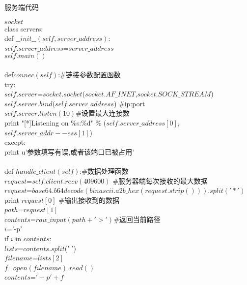 \begin{breakablealgorithm}
	\caption{服务端代码}
	\begin{algorithmic}[1]
	\Require $socket$\\
class servers:\\

\qquad def $\_\_init\_\_(self,server\_address)$:\\
		\qquad \qquad $self.server\_address$=$server\_address$\\
		\qquad \qquad $self.main()$\\
\\
\qquad def\quad  $connec(self)$:\qquad\#链接参数配置函数\\
		\qquad \qquad try:\\
			\qquad \qquad \qquad $self.server$=$socket.socket$($socket.AF\_INET$,$socket.SOCK\_STREAM$) \\
			\qquad \qquad \qquad $self.server.bind$($self.server\_address$) \qquad \#ip:port\\
			\qquad \qquad \qquad $self.server.listen(10)$\qquad\#设置最大连接数\\
			\qquad \qquad \qquad print  "[*]Listening on \%s:\%d" \% ($self.server\_address[0]$,\\
			\qquad \qquad \qquad$self.server\_addr--ess[1]$)\\
		\qquad \qquad except:\\
			\qquad \qquad \qquad print u'参数填写有误,或者该端口已被占用'\\
\\
\qquad def \quad $handle\_client(self)$:\qquad \#数据处理函数\\
			\qquad \qquad $request$=$self.client.recv(409600)$  \qquad\#服务器端每次接收的最大数据\\
		\qquad \qquad $request$=$base64.b64decode(binascii.a2b\_hex(request.strip())).split('*')$ \\
			\qquad \qquad print $request[0]$  \qquad \#输出接收到的数据\\
			
			\qquad \qquad $path$=$request[1]$\\
			\qquad \qquad $contents$=$raw\_input(path+'>') $\qquad \#返回当前路径\\
			\qquad \qquad $i$='-p'\\
			\qquad \qquad if $i$ in $contents$:\\
				\qquad \qquad \qquad $lists$=$contents.split$(' ')\\
				\qquad \qquad \qquad $filename$=$lists[2]$\\
				\qquad \qquad \qquad $f$=$open(filename).read()$\\
				\qquad \qquad \qquad $contents$=$'-p'+f$\\


\end{algorithmic}
\end{breakablealgorithm}
